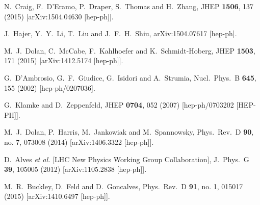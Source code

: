 \documentclass[preprintnumbers,superscriptaddress,nofootinbib,aps,prd,floatfix]{revtex4}
\begin{document}
\begin{thebibliography}{99}
  N.~Craig, F.~D'Eramo, P.~Draper, S.~Thomas and H.~Zhang,
  JHEP {\bf 1506}, 137 (2015)
  [arXiv:1504.04630 [hep-ph]].

  J.~Hajer, Y.~Y.~Li, T.~Liu and J.~F.~H.~Shiu,
  arXiv:1504.07617 [hep-ph].

  M.~J.~Dolan, C.~McCabe, F.~Kahlhoefer and K.~Schmidt-Hoberg,
  JHEP {\bf 1503}, 171 (2015)
  [arXiv:1412.5174 [hep-ph]].
    
  G.~D'Ambrosio, G.~F.~Giudice, G.~Isidori and A.~Strumia,
  Nucl.\ Phys.\ B {\bf 645}, 155 (2002)
  [hep-ph/0207036].

  G.~Klamke and D.~Zeppenfeld,
  JHEP {\bf 0704}, 052 (2007)
  [hep-ph/0703202 [HEP-PH]].

  M.~J.~Dolan, P.~Harris, M.~Jankowiak and M.~Spannowsky,
  Phys.\ Rev.\ D {\bf 90}, no. 7, 073008 (2014)
  [arXiv:1406.3322 [hep-ph]].

  D.~Alves {\it et al.} [LHC New Physics Working Group Collaboration],
  J.\ Phys.\ G {\bf 39}, 105005 (2012)
  [arXiv:1105.2838 [hep-ph]].
  
  M.~R.~Buckley, D.~Feld and D.~Goncalves,
  Phys.\ Rev.\ D {\bf 91}, no. 1, 015017 (2015)
  [arXiv:1410.6497 [hep-ph]].


\end{thebibliography}
\end{document}
